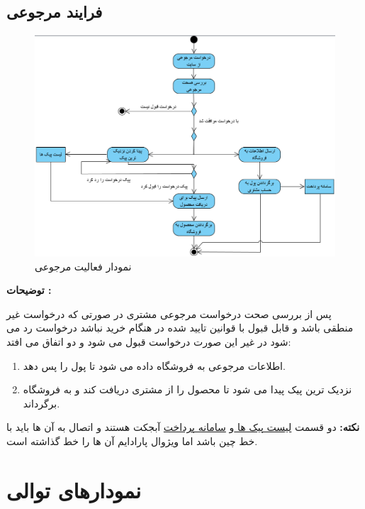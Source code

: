 \documentclass[12pt,a4paper]{article}
\begin{document}
	\subsection{فرایند مرجوعی} \label{section.activity.return}
		\begin{figure}[h!]
			\begin{center}
				\includegraphics[width=14cm]{images/Return Activity Diagram.png}
			\end{center}
			\caption{نمودار فعالیت مرجوعی}
		\end{figure}
		
	\textbf{توضیحات :} 
	
	
	پس از بررسی صحت درخواست مرجوعی مشتری در صورتی که درخواست غیر منطقی باشد و قابل قبول با قوانین تایید شده در هنگام خرید نباشد درخواست رد می شود در غیر این صورت درخواست قبول می شود و دو اتفاق می افتد:
	\begin{enumerate}
		\item
		اطلاعات مرجوعی به فروشگاه داده می شود تا پول را پس دهد.
		\item
		نزدیک ترین پیک پیدا می شود تا محصول را از مشتری دریافت کند و به فروشگاه برگرداند.
	\end{enumerate}
	\textbf{نکته: }دو قسمت \underline{لیست پیک ها }و \underline{سامانه پرداخت} آبجکت هستند و اتصال به آن ها باید با خط چین باشد اما ویژوال پارادایم آن ها را خط گذاشته است.
	
\pagebreak

\section{نمودارهای توالی} \label{section.sequence}
\end{document}
